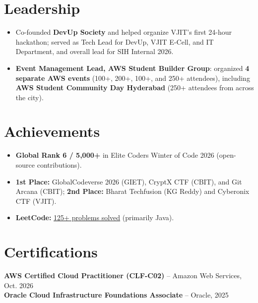 \documentclass[letterpaper,11pt]{article}
\newcommand{\resumeBulletsStart}{
  \begin{itemize}[
    leftmargin=0.18in,
    label=\textbullet,
    topsep=1pt,
    partopsep=0pt,
    itemsep=1pt,
    parsep=0pt
  ]
}
\newcommand{\resumeBulletsEnd}{\end{itemize}}
\newcommand{\resBullet}[1]{\item\small #1}
\begin{document}
\section{Leadership}
\resumeBulletsStart
  \resBullet{Co-founded \textbf{DevUp Society} and helped organize VJIT's first 24-hour hackathon; served as Tech Lead for DevUp, VJIT E-Cell, and IT Department, and overall lead for SIH Internal 2026.}
  \resBullet{\textbf{Event Management Lead, AWS Student Builder Group}: organized \textbf{4 separate AWS events} (100+, 200+, 100+, and 250+ attendees), including \textbf{AWS Student Community Day Hyderabad} (250+ attendees from across the city).}
\resumeBulletsEnd

\section{Achievements}
\resumeBulletsStart
  \resBullet{\textbf{Global Rank 6 / 5,000+} in Elite Coders Winter of Code 2026 (open-source contributions).}
  \resBullet{\textbf{1st Place:} GlobalCodeverse 2026 (GIET), CryptX CTF (CBIT), and Git Arcana (CBIT); \textbf{2nd Place:} Bharat Techfusion (KG Reddy) and Cyberonix CTF (VJIT).}
  \resBullet{\textbf{LeetCode:} \href{https://leetcode.com/u/saidoesleetcode/}{\underline{125+ problems solved}} (primarily Java).}
\resumeBulletsEnd

\section{Certifications}
{\small
\textbf{AWS Certified Cloud Practitioner (CLF-C02)}
-- Amazon Web Services, Oct. 2026\\[1pt]
\textbf{Oracle Cloud Infrastructure Foundations Associate}
-- Oracle, 2025
}
\end{document}
